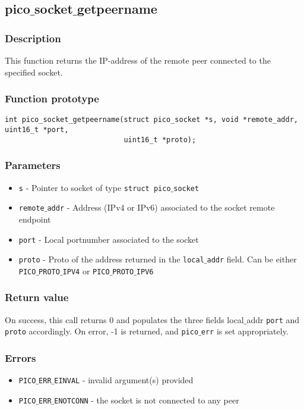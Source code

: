 \subsection{pico$\_$socket$\_$getpeername}

\subsubsection*{Description}
This function returns the IP-address of the remote peer connected to the specified socket.

\subsubsection*{Function prototype}
\begin{verbatim}
int pico_socket_getpeername(struct pico_socket *s, void *remote_addr, uint16_t *port, 
                            uint16_t *proto);
\end{verbatim}


\subsubsection*{Parameters}
\begin{itemize}[noitemsep]
\item \texttt{s} - Pointer to socket of type \texttt{struct pico$\_$socket}
\item \texttt{remote$\_$addr} - Address (IPv4 or IPv6) associated to the socket remote endpoint
\item \texttt{port} - Local portnumber associated to the socket
\item \texttt{proto} - Proto of the address returned in the \texttt{local$\_$addr} field. Can be either \texttt{PICO$\_$PROTO$\_$IPV4} or \texttt{PICO$\_$PROTO$\_$IPV6}
\end{itemize}

\subsubsection*{Return value}
On success, this call returns 0 and populates the three fields {local$\_$addr} \texttt{port} and \texttt{proto} accordingly.
On error, -1 is returned, and \texttt{pico$\_$err} is set appropriately.

\subsubsection*{Errors}
\begin{itemize}[noitemsep]
\item \texttt{PICO$\_$ERR$\_$EINVAL} - invalid argument(s) provided
\item \texttt{PICO$\_$ERR$\_$ENOTCONN} - the socket is not connected to any peer
\end{itemize}

